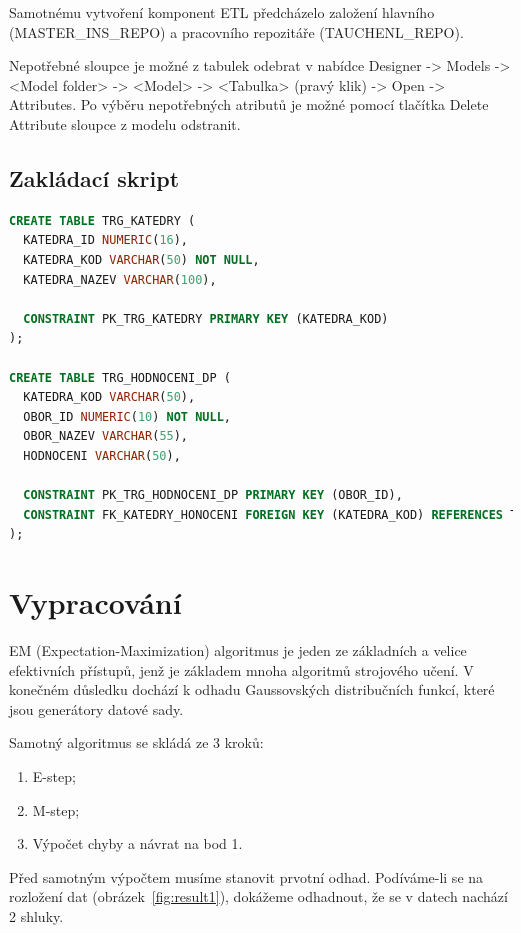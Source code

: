 Samotnému vytvoření komponent ETL předcházelo založení hlavního (MASTER\_INS\_REPO) a pracovního repozitáře (TAUCHENL\_REPO).

Nepotřebné sloupce je možné z tabulek odebrat v nabídce Designer -> Models -> <Model folder> -> <Model> -> <Tabulka> (pravý klik) -> Open -> Attributes.
Po výběru nepotřebných atributů je možné pomocí tlačítka Delete Attribute sloupce z modelu odstranit.

\subsection{Zakládací skript}

\begin{lstlisting}[language=sql]
CREATE TABLE TRG_KATEDRY (
  KATEDRA_ID NUMERIC(16),
  KATEDRA_KOD VARCHAR(50) NOT NULL,
  KATEDRA_NAZEV VARCHAR(100),

  CONSTRAINT PK_TRG_KATEDRY PRIMARY KEY (KATEDRA_KOD)
);

CREATE TABLE TRG_HODNOCENI_DP (
  KATEDRA_KOD VARCHAR(50),
  OBOR_ID NUMERIC(10) NOT NULL,
  OBOR_NAZEV VARCHAR(55),
  HODNOCENI VARCHAR(50),

  CONSTRAINT PK_TRG_HODNOCENI_DP PRIMARY KEY (OBOR_ID),
  CONSTRAINT FK_KATEDRY_HONOCENI FOREIGN KEY (KATEDRA_KOD) REFERENCES TRG_KATEDRY (KATEDRA_KOD)
);
\end{lstlisting}

\section{Vypracování}

EM (Expectation-Maximization) algoritmus je jeden ze základních a velice efektivních přístupů, jenž je základem mnoha algoritmů strojového učení.
V konečném důsledku dochází k odhadu Gaussovských distribučních funkcí, které jsou generátory datové sady.

Samotný algoritmus se skládá ze 3 kroků:

\begin{enumerate}
    \item E-step;
    \item M-step;
    \item Výpočet chyby a návrat na bod 1.
\end{enumerate}

Před samotným výpočtem musíme stanovit prvotní odhad.
Podíváme-li se na rozložení dat (obrázek~\ref{fig:result1}), dokážeme odhadnout, že se v datech nachází 2 shluky.

